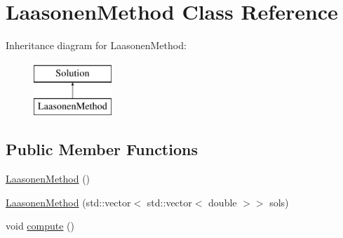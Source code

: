 \hypertarget{class_laasonen_method}{}\section{Laasonen\+Method Class Reference}
\label{class_laasonen_method}
Inheritance diagram for Laasonen\+Method\+:\begin{figure}[H]
\begin{center}
\leavevmode
\includegraphics[height=2.000000cm]{class_laasonen_method}
\end{center}
\end{figure}
\subsection*{Public Member Functions}
\begin{DoxyCompactItemize}
\item 
\hyperlink{class_laasonen_method_a1bff2dc73fc66c3070fc7a187ff556f9}{Laasonen\+Method} ()
\item 
\hyperlink{class_laasonen_method_a55dc0b88c2298a492d186564b9baed26}{Laasonen\+Method} (std\+::vector$<$ std\+::vector$<$ double $>$$>$ sols)
\item 
void \hyperlink{class_laasonen_method_ac5507d58a6c59f0ba9eaa3ca54a51f5d}{compute} ()
\end{DoxyCompactItemize}

